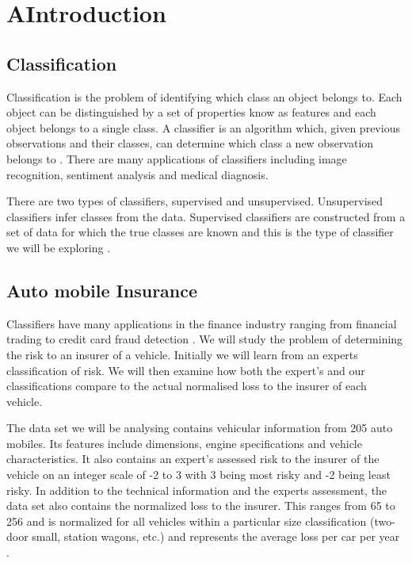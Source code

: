 \chapter{AIntroduction}

\section{Classification}

Classification is the problem of identifying which class an object belongs to.
Each object can be distinguished by a set of properties know as features and each object belongs to a single class.
A classifier is an algorithm which, given previous observations and their classes, can determine which class a new observation belongs to \cite{Theodoridis03}.
There are many applications of classifiers including image recognition, sentiment analysis and medical diagnosis.

There are two types of classifiers, supervised and unsupervised.
Unsupervised classifiers infer classes from the data.
Supervised classifiers are constructed from a set of data for which the true classes are known and this is the type of classifier we will be exploring \cite{Michie94}.

\section{Auto mobile Insurance}

Classifiers have many applications in the finance industry ranging from financial trading \cite{Gerlein16} to credit card fraud detection \cite{Pozzolo15}.
We will study the problem of determining the risk to an insurer of a vehicle.
Initially we will learn from an experts classification of risk.
We will then examine how both the expert's and our classifications compare to the actual normalised loss to the insurer of each vehicle.

The data set we will be analysing contains vehicular information from 205 auto mobiles.
Its features include dimensions, engine specifications and vehicle characteristics.
It also contains an expert's assessed risk to the insurer of the vehicle on an integer scale of -2 to 3 with 3 being most risky and -2 being least risky.
In addition to the technical information and the experts assessment, the data set also contains the normalized loss to the insurer.
This ranges from 65 to 256 and is normalized for all vehicles within a particular size classification (two-door small, station wagons, etc.) and represents the average loss per car per year \cite{Automobile}.